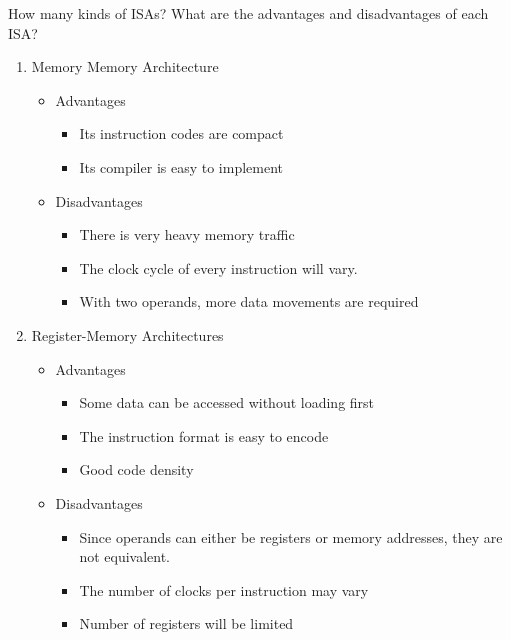 \begin{exercise}[]{How many kinds of ISAs? What are the advantages and disadvantages of each ISA?
    }
\begin{solution}
\begin{enumerate}
\begin{itemize}
        \item Disadvantages
        \begin{itemize}
            \item There is heavy memory traffic
            \item The accumulator will become the bottleneck and there is little potential for parallelism and pipelining
        \end{itemize}
    \end{itemize}

    \item Memory Memory Architecture
    \begin{itemize}
        \item Advantages
        \begin{itemize}
            \item Its instruction codes are compact
            \item Its compiler is easy to implement
        \end{itemize}
        
        \item Disadvantages
        \begin{itemize}
            \item There is very heavy memory traffic
            \item The clock cycle of every instruction will vary.
            \item With two operands, more data movements are required
        \end{itemize}
    \end{itemize}

    \item Register-Memory Architectures
    \begin{itemize}
        \item Advantages
        \begin{itemize}
            \item Some data can be accessed without loading first
            \item The instruction format is easy to encode
            \item Good code density
        \end{itemize}
        
        \item Disadvantages
        \begin{itemize}
            \item Since operands can either be registers or memory addresses, they are not equivalent.
            \item The number of clocks per instruction may vary
            \item Number of registers will be limited
        \end{itemize}
    \end{itemize}


\end{enumerate}
\end{solution}
\end{exercise}
